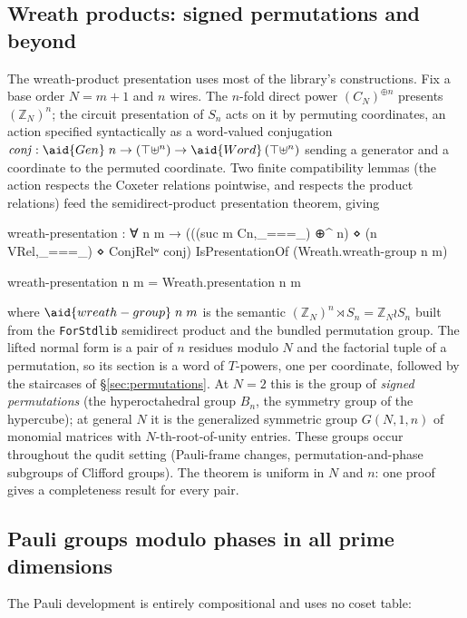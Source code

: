 \subsection{Wreath products: signed permutations and beyond}\label{sec:wreath}

The wreath-product presentation uses most of the library's
constructions.  Fix a base order $N = m{+}1$ and $n$ wires.  The $n$-fold
direct power $(C_N)^{\oplus n}$ presents $(\mathbb{Z}_N)^n$; the circuit
presentation of $S_n$ acts on it by permuting coordinates, an action
specified syntactically as a word-valued conjugation
$\mathit{conj} : \aid{Gen}\;n \to (\top \uplus^n) \to
\aid{Word}\,(\top \uplus^n)$ sending a generator and a coordinate to the
permuted coordinate.  Two finite compatibility lemmas (the action
respects the Coxeter relations pointwise, and respects the product
relations) feed the semidirect-product presentation theorem, giving
\begin{code}
wreath-presentation : ∀ n m → (((suc m Cn,_===_) ⊕^ n) ⋄ (n VRel,_===_) ⋄ ConjRelʷ conj)
                                IsPresentationOf (Wreath.wreath-group n m)
\end{code}
\begin{code}[hide]
wreath-presentation n m = Wreath.presentation n m
\end{code}
where $\aid{wreath-group}\;n\;m$ is the semantic
$(\mathbb{Z}_N)^n \rtimes S_n = \mathbb{Z}_N \wr S_n$ built from the
\texttt{ForStdlib} semidirect product and the bundled permutation group.
The lifted normal form is a pair of $n$ residues modulo $N$ and the
factorial tuple of a permutation, so its section is a word of $T$-powers,
one per coordinate, followed by the staircases of
\S\ref{sec:permutations}.  At $N = 2$ this is the group of
\emph{signed permutations} (the hyperoctahedral group $B_n$, the
symmetry group of the hypercube); at
general $N$ it is the generalized symmetric group $G(N,1,n)$ of monomial
matrices with $N$-th-root-of-unity entries.  These groups occur throughout
the qudit setting (Pauli-frame changes, permutation-and-phase
subgroups of Clifford groups).  The theorem is uniform in $N$ and $n$:
one proof gives a completeness result for every pair.

\subsection{Pauli groups modulo phases in all prime dimensions}\label{sec:pauli}

The Pauli development is entirely compositional and uses no coset table:

